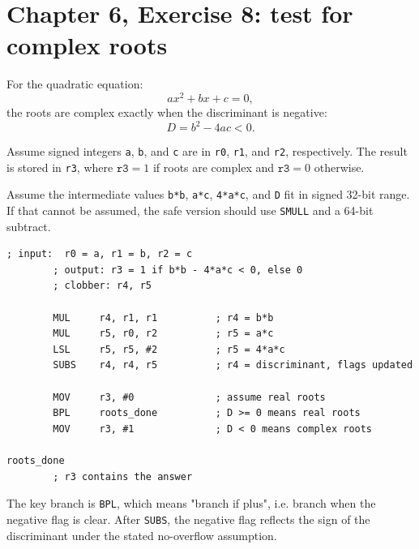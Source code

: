 \documentclass[11pt]{article}
\newcommand{\code}[1]{\texttt{#1}}
\begin{document}
\section*{Chapter 6, Exercise 8: test for complex roots}

For the quadratic equation:
\[
ax^2 + bx + c = 0,
\]
the roots are complex exactly when the discriminant is negative:
\[
D = b^2 - 4ac < 0.
\]

Assume signed integers \code{a}, \code{b}, and \code{c} are in \code{r0}, \code{r1}, and \code{r2}, respectively. The result is stored in \code{r3}, where \(\code{r3}=1\) if roots are complex and \(\code{r3}=0\) otherwise.

Assume the intermediate values \code{b*b}, \code{a*c}, \code{4*a*c}, and \code{D} fit in signed 32-bit range. If that cannot be assumed, the safe version should use \code{SMULL} and a 64-bit subtract.

\begin{Verbatim}[fontsize=\small]
        ; input:  r0 = a, r1 = b, r2 = c
        ; output: r3 = 1 if b*b - 4*a*c < 0, else 0
        ; clobber: r4, r5

        MUL     r4, r1, r1          ; r4 = b*b
        MUL     r5, r0, r2          ; r5 = a*c
        LSL     r5, r5, #2          ; r5 = 4*a*c
        SUBS    r4, r4, r5          ; r4 = discriminant, flags updated

        MOV     r3, #0              ; assume real roots
        BPL     roots_done          ; D >= 0 means real roots
        MOV     r3, #1              ; D < 0 means complex roots

roots_done
        ; r3 contains the answer
\end{Verbatim}

The key branch is \code{BPL}, which means "branch if plus", i.e. branch when the negative flag is clear. After \code{SUBS}, the negative flag reflects the sign of the discriminant under the stated no-overflow assumption.
\end{document}

